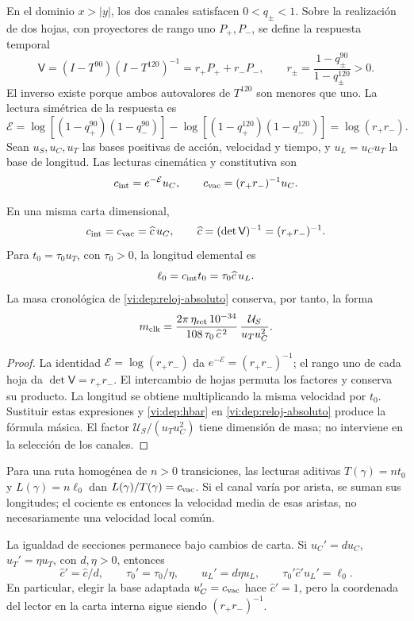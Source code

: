 En el dominio \(x>|y|\), los dos canales satisfacen \(0<q_\pm<1\).
Sobre la realización de dos hojas, con proyectores de rango uno
\(P_+,P_-\), se define la respuesta temporal
\[
 \mathsf V=(I-T^{90})(I-T^{120})^{-1}
          =r_+P_++r_-P_-,
 \qquad r_\pm=\frac{1-q_\pm^{90}}{1-q_\pm^{120}}>0.
\]
El inverso existe porque ambos autovalores de \(T^{120}\) son menores
que uno. La lectura simétrica de la respuesta es
\[
 \mathcal E=
 \log[(1-q_+^{90})(1-q_-^{90})]
 -\log[(1-q_+^{120})(1-q_-^{120})]
 =\log(r_+r_-).
\]
Sean \(u_S,u_C,u_T\) las bases positivas de acción, velocidad y
tiempo, y \(u_L=u_Cu_T\) la base de longitud. Las lecturas
cinemática y constitutiva son
\[
 c_{\rm int}=e^{-\mathcal E}u_C,\qquad
 c_{\rm vac}=(r_+r_-)^{-1}u_C.
\]

\begin{proposition}
\label{vi:dep:velocidad-comun}
En una misma carta dimensional,
\[
 c_{\rm int}=c_{\rm vac}=\widehat c\,u_C,
 \qquad \widehat c=(\det\mathsf V)^{-1}=(r_+r_-)^{-1}.
\]
Para \(t_0=\tau_0u_T\), con \(\tau_0>0\), la longitud elemental es
\[
 \ell_0=c_{\rm int}t_0=\tau_0\widehat c\,u_L.
\]
La masa cronológica de \eqref{vi:dep:reloj-absoluto} conserva, por
tanto, la forma
\[
 m_{\rm clk}=
 \frac{2\pi\,\eta_{\rm ret}\,10^{-34}}
      {108\,\tau_0\,\widehat c^{\,2}}\,
 \frac{\mathcal U_S}{u_Tu_C^2}.
\]
\end{proposition}
\begin{proof}
La identidad \(\mathcal E=\log(r_+r_-)\) da
\(e^{-\mathcal E}=(r_+r_-)^{-1}\); el rango uno de cada hoja da
\(\det\mathsf V=r_+r_-\). El intercambio de hojas permuta los
factores y conserva su producto. La longitud se obtiene multiplicando
la misma velocidad por \(t_0\). Sustituir estas expresiones y
\eqref{vi:dep:hbar} en \eqref{vi:dep:reloj-absoluto} produce la
fórmula másica. El factor \(\mathcal U_S/(u_Tu_C^2)\) tiene
dimensión de masa; no interviene en la selección de los canales.
\end{proof}

Para una ruta homogénea de \(n>0\) transiciones, las lecturas aditivas
\(T(\gamma)=nt_0\) y \(L(\gamma)=n\ell_0\) dan
\(L(\gamma)/T(\gamma)=c_{\rm vac}\). Si el canal varía por
arista, se suman sus longitudes; el cociente es entonces la velocidad
media de esas aristas, no necesariamente una velocidad local común.

La igualdad de secciones permanece bajo cambios de carta. Si
\(u_C'=du_C\), \(u_T'=\eta u_T\), con \(d,\eta>0\), entonces
\[
 \widehat c'=\widehat c/d,\qquad
 \tau_0'=\tau_0/\eta,\qquad u_L'=d\eta u_L,
 \qquad
 \tau_0'\widehat c'u_L'=\ell_0.
\]
En particular, elegir la base adaptada \(u_C'=c_{\rm vac}\)
hace \(\widehat c'=1\), pero la coordenada del lector en la
carta interna sigue siendo \((r_+r_-)^{-1}\).


